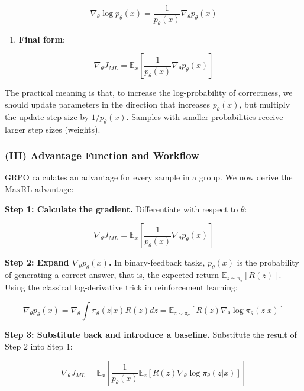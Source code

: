 \[
\nabla_\theta \log p_\theta(x)=\frac{1}{p_\theta(x)}\nabla_\theta p_\theta(x)
\]

\begin{enumerate}
\def\labelenumi{\arabic{enumi}.}
\setcounter{enumi}{3}
\tightlist
\item
{}
  \textbf{Final form}:
\end{enumerate}

\[
\nabla_\theta J_{ML}=\mathbb{E}_x\left[\frac{1}{p_\theta(x)}\nabla_\theta p_\theta(x)\right]
\]

The practical meaning is that, to increase the log-probability of correctness, we should update parameters in the direction that increases \(p_\theta(x)\), but multiply the update step size by \(1/p_\theta(x)\). Samples with smaller probabilities receive larger step sizes (weights).

\hypertarget{iii-advantage-function-and-workflow}{%
\subsubsection{(III) Advantage Function and Workflow}\label{iii-advantage-function-and-workflow}}

GRPO calculates an advantage for every sample in a group. We now derive the MaxRL advantage:

\textbf{Step 1: Calculate the gradient.} Differentiate with respect to \(\theta\):

\[
\nabla_\theta J_{ML}=\mathbb{E}_x\left[\frac{1}{p_\theta(x)}\nabla_\theta p_\theta(x)\right]
\]

\textbf{Step 2: Expand \(\nabla_\theta p_\theta(x)\).} In binary-feedback tasks, \(p_\theta(x)\) is the probability of generating a correct answer, that is, the expected return \(\mathbb{E}_{z\sim\pi_\theta}[R(z)]\). Using the classical log-derivative trick in reinforcement learning:

\[
\nabla_\theta p_\theta(x)=\nabla_\theta\int \pi_\theta(z|x)R(z)dz
=\mathbb{E}_{z\sim\pi_\theta}\left[R(z)\nabla_\theta\log \pi_\theta(z|x)\right]
\]

\textbf{Step 3: Substitute back and introduce a baseline.} Substitute the result of Step 2 into Step 1:

\[
\nabla_\theta J_{ML}=\mathbb{E}_x\left[\frac{1}{p_\theta(x)}\mathbb{E}_z\left[R(z)\nabla_\theta\log \pi_\theta(z|x)\right]\right]
\]

